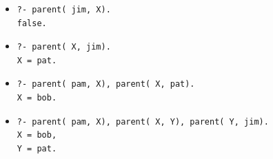 
\begin{itemize}
    \item[(a)]
        \begin{verbatim}
?- parent( jim, X).
false.
        \end{verbatim}
    \item[(b)]
        \begin{verbatim}
?- parent( X, jim).
X = pat.
        \end{verbatim}
    \item[(c)]
        \begin{verbatim}
?- parent( pam, X), parent( X, pat).
X = bob.
        \end{verbatim}
    \item[(d)]
        \begin{verbatim}
?- parent( pam, X), parent( X, Y), parent( Y, jim).
X = bob,
Y = pat.
        \end{verbatim}
\end{itemize}
